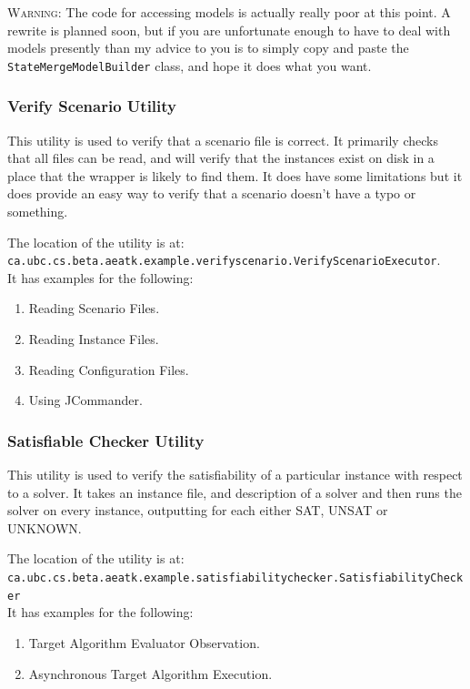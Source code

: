 \documentclass[11pt,letterpaper,oneside]{article}
\begin{document}
{\Large \textsc{Warning:}} The code for accessing models is actually really poor at this point. A rewrite is planned soon, but if you are unfortunate enough to have to deal with models presently than my advice to you is to simply copy and paste the \texttt{StateMergeModelBuilder} class, and hope it does what you want.

\subsubsection{Verify Scenario Utility}

This utility is used to verify that a scenario file is correct. It primarily checks that all files can be read, and will verify that the instances exist on disk in a place that the wrapper is likely to find them. It does have some limitations but it does provide an easy way to verify that a scenario doesn't have a typo or something.

The location of the utility is at:\\ \texttt{ca.ubc.cs.beta.aeatk.example.verifyscenario.VerifyScenarioExecutor}.
\\
It has examples for the following:

\begin{enumerate}
\item Reading Scenario Files.
\item Reading Instance Files.
\item Reading Configuration Files.
\item Using JCommander.
\end{enumerate}

\subsubsection{Satisfiable Checker Utility}

This utility is used to verify the satisfiability of a particular instance with respect to a solver. It takes an instance file, and description of a solver and then runs the solver on every instance, outputting for each either SAT, UNSAT or UNKNOWN.

The location of the utility is at:\\ \texttt{ca.ubc.cs.beta.aeatk.example.satisfiabilitychecker.SatisfiabilityChecker}
\\
It has examples for the following:

\begin{enumerate}
\item Target Algorithm Evaluator Observation.
\item Asynchronous Target Algorithm Execution.
\end{enumerate}
\end{document}
